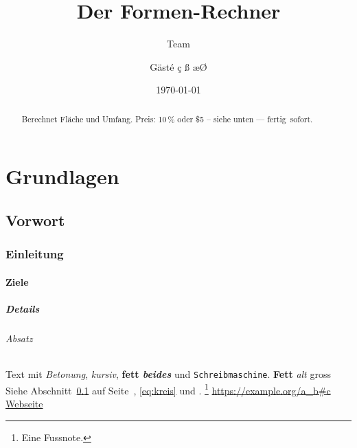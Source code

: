 \documentclass[11pt,a4paper]{article}
\title{Der Formen-Rechner}
\author{Team \and G\"ast\'e \c{c} \ss{} \ae \O}
\date{\today}
\begin{document}
\maketitle
\tableofcontents

\begin{abstract}
  Berechnet Fl\"ache und Umfang. Preis: 10\,\% oder \$5 -- siehe unten --- fertig~sofort.
\end{abstract}

\part{Grundlagen}
\chapter*{Vorwort}
\section{Einleitung}\label{sec:einleitung}
\subsection*{Ziele}
\subsubsection{Details}
\paragraph{Absatz} Text mit \emph{Betonung}, \textit{kursiv}, \textbf{fett \textit{beides}}
und \texttt{Schreibmaschine}. {\bfseries Fett} {\em alt} {\Large gross}\\[2ex]
Siehe Abschnitt~\ref{sec:einleitung} auf Seite~\pageref{sec:einleitung}, \eqref{eq:kreis}
und \cite[S.~5]{knuth84,lamport94}. \nocite{*} \footnote{Eine Fussnote.}
\url{https://example.org/a_b#c} \href{https://example.org}{Webseite}
\end{document}
